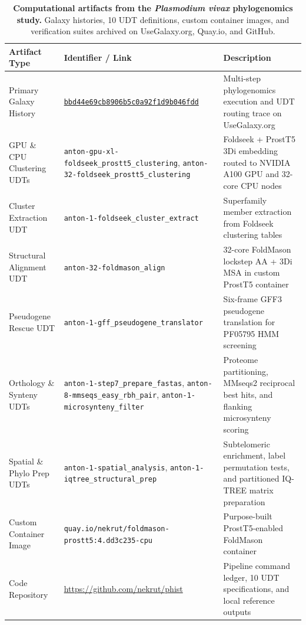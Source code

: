 \documentclass[11pt,letterpaper]{article}
\newcommand{\tool}[1]{\textsf{#1}}
\begin{document}
\begin{table}[!htbp]
\centering
\footnotesize
\begin{tabularx}{\textwidth}{p{}p{}X}
\toprule
\textbf{Artifact Type} & \textbf{Identifier / Link} & \textbf{Description} \\
\midrule
Primary Galaxy History & \href{https://usegalaxy.org/histories/view?id=bbd44e69cb8906b5c0a92f1d9b046fdd}{\texttt{bbd44e69cb8906b5c0a92f1d9b046fdd}} & Multi-step phylogenomics execution and UDT routing trace on UseGalaxy.org \\
GPU \& CPU Clustering UDTs & \nolinkurl{anton-gpu-xl-foldseek_prostt5_clustering}, \nolinkurl{anton-32-foldseek_prostt5_clustering} & \tool{Foldseek} + \tool{ProstT5} 3Di embedding routed to NVIDIA A100 GPU and 32-core CPU nodes \\
Cluster Extraction UDT & \nolinkurl{anton-1-foldseek_cluster_extract} & Superfamily member extraction from \tool{Foldseek} clustering tables \\
Structural Alignment UDT & \nolinkurl{anton-32-foldmason_align} & 32-core \tool{FoldMason} lockstep AA + 3Di MSA in custom \tool{ProstT5} container \\
Pseudogene Rescue UDT & \nolinkurl{anton-1-gff_pseudogene_translator} & Six-frame GFF3 pseudogene translation for PF05795 HMM screening \\
Orthology \& Synteny UDTs & \nolinkurl{anton-1-step7_prepare_fastas}, \nolinkurl{anton-8-mmseqs_easy_rbh_pair}, \nolinkurl{anton-1-microsynteny_filter} & Proteome partitioning, \tool{MMseqs2} reciprocal best hits, and flanking microsynteny scoring \\
Spatial \& Phylo Prep UDTs & \nolinkurl{anton-1-spatial_analysis}, \nolinkurl{anton-1-iqtree_structural_prep} & Subtelomeric enrichment, label permutation tests, and partitioned \tool{IQ-TREE} matrix preparation \\
Custom Container Image & \nolinkurl{quay.io/nekrut/foldmason-prostt5:4.dd3c235-cpu} & Purpose-built \tool{ProstT5}-enabled \tool{FoldMason} container \\
Code Repository & \url{https://github.com/nekrut/phist} & Pipeline command ledger, 10 UDT specifications, and local reference outputs \\
\bottomrule
\end{tabularx}
\caption{\textbf{Computational artifacts from the \textit{Plasmodium vivax} phylogenomics study.} Galaxy histories, 10 UDT definitions, custom container images, and verification suites archived on UseGalaxy.org, Quay.io, and GitHub.}
\label{tab:case2_artifacts}
\end{table}
\end{document}
